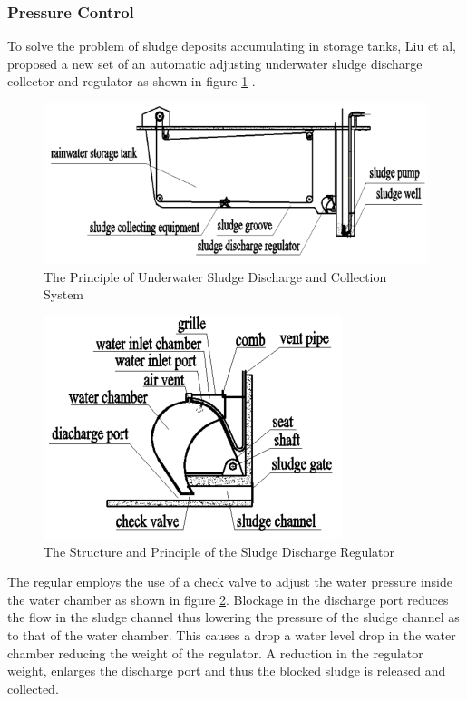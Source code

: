 \subsubsection{Pressure Control }
To solve the problem of sludge deposits accumulating in storage tanks, Liu et al,\cite{liu2018research} proposed a new set of an automatic adjusting underwater sludge discharge collector and regulator  as shown in figure \ref{fig:sludge1} . 
\begin{figure}[ht]
\includegraphics[width=0.9\linewidth]{Figures/sludge1.png}
\centering
\caption{ The Principle of Underwater Sludge Discharge and Collection System \cite{liu2018research}}
\label{fig:sludge1}
\end{figure}
\begin{figure}[ht]
\includegraphics[width=0.7\linewidth]{Figures/sludge 2.png}
\centering
\caption{ The Structure and Principle of the Sludge Discharge Regulator \cite{liu2018research}}
\label{fig:sludge 2}
\end{figure}
The regular employs the use of a check valve to adjust the water pressure inside the water chamber as shown in figure \ref{fig:sludge 2}. Blockage in the discharge port reduces the flow in the sludge channel thus lowering the pressure of the sludge channel as to that of the water chamber. This causes a drop a water level drop in the water chamber reducing the weight of the regulator. A reduction in the regulator weight, enlarges the discharge port and thus the blocked sludge is released and collected.
